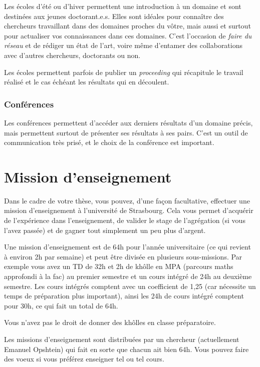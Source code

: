\documentclass[a5paper]{article}
\begin{document}
Les écoles d'été ou d'hiver permettent une introduction à un domaine
et sont destinées aux jeunes doctorant.e.s. Elles sont idéales pour connaître des chercheurs travaillant dans des domaines proches du vôtre, mais aussi et surtout pour actualiser vos connaissances dans ces domaines. C'est l'occasion de \textit{faire du réseau} et de rédiger un état de l'art, voire même d'entamer des collaborations avec d'autres chercheurs, doctorants ou non.

Les écoles permettent parfois de publier un \textit{proceeding} qui récapitule le travail réalisé et le cas échéant les résultats qui en découlent.

\subsubsection{Conférences}
\label{subsubsec:conf}

Les conférences permettent d'accéder aux derniers résultats d'un
domaine précis, mais permettent surtout de présenter ses résultats à
ses pairs. C'est un outil de communication très prisé, et le choix de
la conférence est important.


\section{Mission d'enseignement}

Dans le cadre de votre thèse, vous pouvez, d'une façon facultative, effectuer une mission d'enseignement à l'université de Strasbourg. Cela vous permet d'acquérir de l'expérience dans l'enseignement, de valider le stage de l'agrégation (si vous l'avez passée) et de gagner tout simplement un peu plus d'argent.

Une mission d'enseignement est de 64h pour l'année universitaire (ce qui revient à environ 2h par semaine) et peut être divisée en plusieurs sous-missions. Par exemple vous avez un TD de 32h et 2h de khôlle en MPA (parcours maths approfondi à la fac) au premier semestre et un cours intégré de 24h au deuxième semestre. Les cours intégrés comptent avec un coefficient de 1,25 (car nécessite un temps de préparation plus important), ainsi les 24h de cours intégré comptent pour 30h, ce qui fait un total de 64h.

Vous n'avez pas le droit de donner des khôlles en classe préparatoire.

Les missions d'enseignement sont distribuées par un chercheur (actuellement Emanuel Opshtein) qui fait en sorte que chacun ait bien 64h. Vous pouvez faire des voeux si vous préférez enseigner tel ou tel cours.
\end{document}
